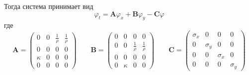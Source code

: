 Тогда система принимает вид
\begin{equation}
	\varphi_t = \bm{A} \varphi_x +  \bm{B} \varphi_y - \bm{C} \varphi
\end{equation}
где 
\begin{equation}
	\bm{A} = 
	\begin{pmatrix}
    	0 & 0 & \frac{1}{\rho} & \frac{1}{\rho} \\
    	0 & 0 & 0 & 0 \\
        \kappa & 0 & 0 & 0 \\
    	0 & 0 & 0 & 0
	\end{pmatrix} \qquad
	\bm{B} = 
	\begin{pmatrix}
    	0 & 0 & 0 & 0 \\
        0 & 0 & \frac{1}{\rho} & \frac{1}{\rho} \\
    	0 & 0 & 0 & 0 \\
        0 & \kappa  & 0 & 0
	\end{pmatrix} \qquad
	\bm{C} = 
	\begin{pmatrix}
    	\sigma_x & 0 & 0 & 0 \\
    	0 & \sigma_y & 0 & 0 \\
        0 & 0 & \sigma_x & 0 \\
    	0 & 0 & 0 & \sigma_y
	\end{pmatrix}
\end{equation}

